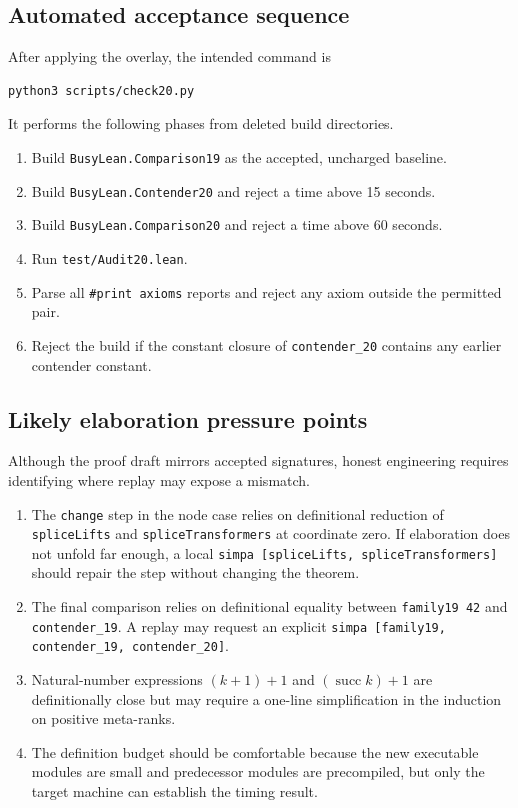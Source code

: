 \documentclass[11pt]{article}
\theoremstyle{definition}
\theoremstyle{remark}
\newcommand{\leanname}[1]{\nolinkurl{#1}}
\newcommand{\code}[1]{\texttt{#1}}
\begin{document}
\subsection{Automated acceptance sequence}

After applying the overlay, the intended command is
\begin{lstlisting}[language={},basicstyle=\ttfamily\small]
python3 scripts/check20.py
\end{lstlisting}
It performs the following phases from deleted build directories.

\begin{enumerate}[leftmargin=*]
\item Build \leanname{BusyLean.Comparison19} as the accepted, uncharged
  baseline.
\item Build \leanname{BusyLean.Contender20} and reject a time above 15 seconds.
\item Build \leanname{BusyLean.Comparison20} and reject a time above 60 seconds.
\item Run \leanname{test/Audit20.lean}.
\item Parse all \code{\#print axioms} reports and reject any axiom outside
  the permitted pair.
\item Reject the build if the constant closure of \leanname{contender_20}
  contains any earlier contender constant.
\end{enumerate}

\subsection{Likely elaboration pressure points}

Although the proof draft mirrors accepted signatures, honest engineering
requires identifying where replay may expose a mismatch.

\begin{enumerate}[leftmargin=*]
\item The \leanname{change} step in the node case relies on definitional
  reduction of \leanname{spliceLifts} and \leanname{spliceTransformers} at
  coordinate zero.  If elaboration does not unfold far enough, a local
  \leanname{simpa [spliceLifts, spliceTransformers]} should repair the step
  without changing the theorem.
\item The final comparison relies on definitional equality between
  \leanname{family19 42} and \leanname{contender_19}.  A replay may request an
  explicit \leanname{simpa [family19, contender_19, contender_20]}.
\item Natural-number expressions $(k+1)+1$ and $(\operatorname{succ} k)+1$ are
  definitionally close but may require a one-line simplification in the
  induction on positive meta-ranks.
\item The definition budget should be comfortable because the new executable
  modules are small and predecessor modules are precompiled, but only the
  target machine can establish the timing result.
\end{enumerate}
\end{document}

